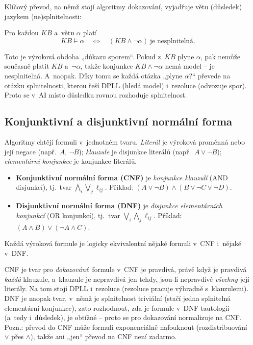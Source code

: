 Klíčový převod, na němž stojí algoritmy dokazování, vyjadřuje větu (důsledek) jazykem (ne)splnitelnosti:

\begin{veta}
Pro každou $KB$ a~větu $\alpha$ platí
\[ KB\models\alpha \quad\Longleftrightarrow\quad (KB\wedge\neg\alpha)\ \text{je nesplnitelná}. \]
\end{veta}

\begin{intuice}
Toto je výroková obdoba „důkazu sporem``. Pokud z~$KB$ plyne $\alpha$, pak nemůže současně platit $KB$ a~$\neg\alpha$, takže konjunkce $KB\wedge\neg\alpha$ nemá model -- je nesplnitelná. A~naopak. Díky tomu se každá otázka „plyne $\alpha$?“ převede na otázku splnitelnosti, kterou řeší DPLL (hledá model) i~rezoluce (odvozuje spor). Proto se v~AI místo důsledku rovnou rozhoduje splnitelnost.
\end{intuice}

\subsection{Konjunktivní a disjunktivní normální forma}

Algoritmy chtějí formuli v~jednotném tvaru. \emph{Literál} je výroková proměnná nebo její negace (např.\ $A$, $\neg B$); \emph{klauzule} je disjunkce literálů (např.\ $A\vee\neg B$); \emph{elementární konjunkce} je konjunkce literálů.

\begin{definice}
\begin{itemize}
  \item \textbf{Konjunktivní normální forma (CNF)} je \emph{konjunkce klauzulí} (AND disjunkcí), tj.\ tvar $\bigwedge_i\bigvee_j \ell_{ij}$. Příklad: $(A\vee\neg B)\wedge(B\vee\neg C\vee\neg D)$.
  \item \textbf{Disjunktivní normální forma (DNF)} je \emph{disjunkce elementárních konjunkcí} (OR konjunkcí), tj.\ tvar $\bigvee_i\bigwedge_j \ell_{ij}$. Příklad: $(A\wedge B)\vee(\neg A\wedge C)$.
\end{itemize}
Každá výroková formule je logicky ekvivalentní nějaké formuli v~CNF i~nějaké v~DNF.
\end{definice}

\begin{intuice}
CNF je tvar pro \emph{dokazování}: formule v~CNF je pravdivá, právě když je pravdivá \emph{každá} klauzule, a~klauzule je nepravdivá jen tehdy, jsou-li nepravdivé \emph{všechny} její literály. Na tom stojí DPLL i~rezoluce (rezoluce pracuje výhradně s~klauzulemi). DNF je naopak tvar, v~němž je splnitelnost triviální (stačí jedna splnitelná elementární konjunkce), zato rozhodnout, zda je formule v~DNF tautologií (a~tedy i~důsledek), je obtížné -- proto se pro dokazování normalizuje na CNF. Pozn.: převod do CNF může formuli exponenciálně nafouknout (rozdistribuování $\vee$ přes $\wedge$), takže ani „jen`` převod na CNF není zadarmo.
\end{intuice}

